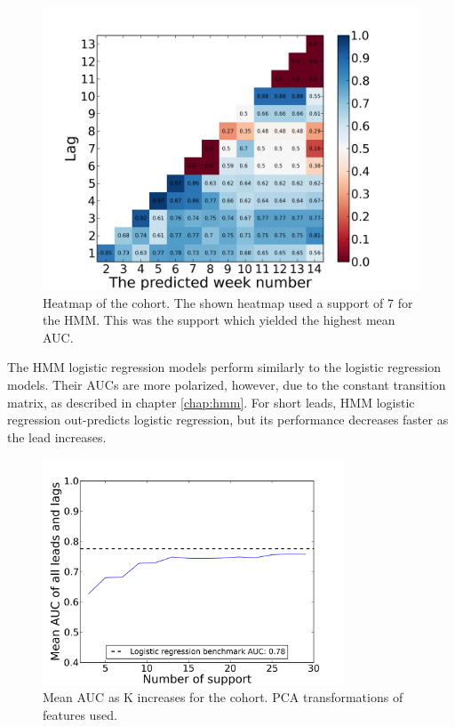 \begin{figure}[ht!]
  \caption{Heatmap of the \wiki cohort. The shown heatmap used a support of 7 for the HMM. This was the support which yielded the highest mean AUC.}\label{fig:hmm_logreg_heatmap_wiki_only}
  \centering
    \includegraphics[width=1.0\textwidth]{figures/hmm_logreg/wiki_only_support_7.png}
\end{figure}

The HMM logistic regression models perform similarly to the logistic regression models. Their AUCs are more polarized, however, due to the constant transition matrix, as described in chapter \ref{chap:hmm}. For short leads, HMM logistic regression out-predicts logistic regression, but its performance decreases faster as the lead increases. 

\begin{figure}[ht!]
  \caption{Mean AUC as K increases for the \neither cohort. PCA transformations of features used.}\label{fig:hmm_logreg_support_over_time_no_collab_pca}
  \centering
    \includegraphics[width=0.8\textwidth]{figures/hmm_logreg/no_collab_pca_support_over_time.png}
\end{figure}

